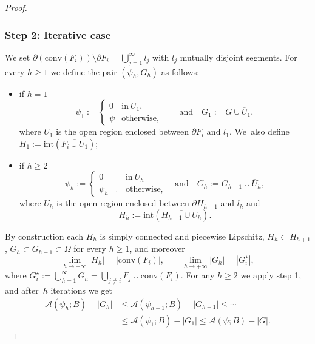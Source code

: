 \documentclass[JEP,XML,SOM,Unicode, NoFloatCountersInSection,published]{cedram}
\let\Om\Omega
\theoremstyle{definition}
\begin{document}
\begin{proof}
\subsubsection*{Step 2: Iterative case}
We set $\partial(\mathrm{conv}(F_i))
\setminus\partial F_i=\bigcup_{j=1}^\infty l_j$ with $l_j$ mutually disjoint segments.
For every $h\ge1$ we define the pair $(\psi_{h},G_{h})$ as follows:
\begin{itemize}
\item if $h=1$
\begin{equation*}
\psi_{1}:=\begin{cases}
0&\text{in}\ U_1,\\
\psi&\text{otherwise,}
\end{cases}\qquad \text{and}\quad
G_{1}:=G\cup \overline U_1,
\end{equation*}
where $U_1$ is the open region enclosed between $\partial F_i$ and $l_1$. We~also define $H_1:=\mathrm{int}(\overline{F_i\cup U_1})$;
\item if $h\ge2$
\begin{equation*}
\psi_{h}:=\begin{cases}
0&\text{in}\ U_h\\
\psi_{h-1}&\text{otherwise,}
\end{cases}\quad\text{and}\quad
G_{h}:=G_{h-1}\cup\overline U_h ,
\end{equation*}
where $U_h$ is the open region enclosed between $\partial H_{h-1}$ and $l_h$ and
\[
H_h:=\mathrm{int}(\overline{H_{h-1}\cup U_h}).
\]
\end{itemize}
By construction each $H_{h}$ is
simply connected and piecewise Lipschitz, $H_{h}\subset H_{h+1}$, $G_{h}\subset G_{h+1}\subset\overline\Om$ for every $h\ge1$, and moreover
\begin{equation}\label{limit_E*}
\lim_{h\to+\infty} |H_{h}|=|\mathrm{conv}(F_i)|,\qquad
\lim_{h\to+\infty} |G_{h}|=|G^\star_i|,
\end{equation}
where $G^\star_i:=\bigcup_{h=1}^\infty G_h=\bigcup_{j\neq i}F_j\cup \mathrm{conv}(F_i) $. For any $h\geq2$ we apply step 1,
and after~$h$ iterations we get
\begin{equation}\label{iterative_proc*}
\begin{aligned}
\mathcal{A}(\psi_{h};B)-|G_{h}|&\le \mathcal{A}(\psi_{h-1};B)-|G_{h-1}|\le\cdots\\
&\le \mathcal{A}(\psi_{1};B)-|G_{1}|\le \mathcal{A}(\psi;B)-|G|.
\end{aligned}
\end{equation}

\end{proof}
\end{document}
